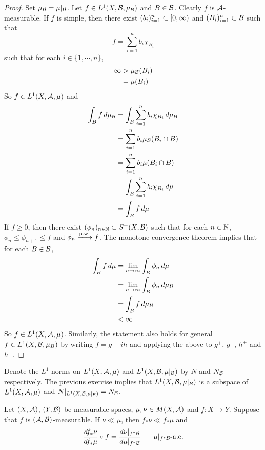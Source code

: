 \documentclass{book}
\begin{document}
	\begin{proof}
		Set $\mu_{\mathcal{B}} = \mu|_{\mathcal{B}}$. Let $f \in L^1(X, \mathcal{B}, \mu_{\mathcal{B}})$ and $B \in \mathcal{B}$. Clearly $f$ is $\mathcal{A}$-measurable. If $f$ is simple, then there exist $(b_i)_{i=1}^n \subset [0,\infty)$ and $(B_i)_{i=1}^n \subset \mathcal{B}$ such that $$f = \sum_{i=1}^n b_i \chi_{B_i}$$ such that for each $i \in \{1, \cdots, n\}$, 
		\begin{align*}
			\infty 
			&> \mu_{\mathcal{B}}(B_i) \\
			&= \mu(B_i)
		\end{align*}
		So $f \in L^1(X, \mathcal{A}, \mu)$ and 
		\begin{align*}
			\int_B f \, d \mu_{\mathcal{B}} 
			&= \int_B \sum_{i=1}^n b_i \chi_{B_i} \, d \mu_{\mathcal{B}} \\
			&= \sum_{i=1}^n b_i \mu_{\mathcal{B}}(B_i \cap B)\\
			&= \sum_{i=1}^n b_i \mu(B_i \cap B)\\
			&= \int_B \sum_{i=1}^n b_i\chi_{B_i} \, d \mu \\
			&= \int_B f \, d \mu
		\end{align*}
		If $f \geq 0$, then there exist $(\phi_n)_{n \in \mathbb{N}} \subset S^+(X, \mathcal{B})$ such that for each $n \in \mathbb{N}$, $\phi_n \leq \phi_{n+1} \leq f$ and $\phi_n \xrightarrow{\text{p.w.}} f$. The monotone convergence theorem implies that for each $B \in \mathcal{B}$,
		\begin{align*}
			\int_B f \, d \mu
			&= \lim \limits_{n \rightarrow \infty} \int_B \phi_n \, d \mu \\
			&= \lim \limits_{n \rightarrow \infty} \int_B \phi_n \, d \mu_{\mathcal{B}} \\
			& = \int_B f \, d \mu_{\mathcal{B}} \\
			& < \infty
		\end{align*}
		So $f \in L^1(X, \mathcal{A}, \mu)$.
		Similarly, the statement also holds for general $f \in L^1(X, \mathcal{B}, \mu_B)$ by writing $f = g+ih$ and applying the above to $g^+$, $g^-$, $h^+$ and $h^-$.
	\end{proof}
	
	\begin{note}
		Denote the $L^1$ norms on $L^1(X, \mathcal{A}, \mu)$ and $L^1(X, \mathcal{B}, \mu|_{\mathcal{B}})$ by $N$ and $N_{\mathcal{B}}$ respectively. The previous exercise implies that $L^1(X, \mathcal{B}, \mu|_{\mathcal{B}})$ is a subspace of $L^1(X, \mathcal{A}, \mu)$ and $N|_{L^1(X, \mathcal{B},\mu|_{\mathcal{B}})} = N_{\mathcal{B}}$.
	\end{note}
	
	
	\begin{ex} 
		Let $(X, \mathcal{A})$, $(Y, \mathcal{B})$ be measurable spaces, $\mu, \nu \in M(X,\mathcal{A})$ and $f: X \rightarrow Y$. Suppose that $f$ is $(\mathcal{A}, \mathcal{B})$-measurable. If $\nu \ll \mu$, then $f_*\nu \ll f_*\mu$ and 
		$$\frac{d f_*\nu}{d f_*\mu} \circ f = \frac{d\nu|_{f^* \mathcal{B}}}{d \mu|_{f^*\mathcal{B}}}  \hspace{.5cm} \text{ $\mu|_{f^*\mathcal{B}}$-a.e.}$$ 
	\end{ex}
	
\end{document}

